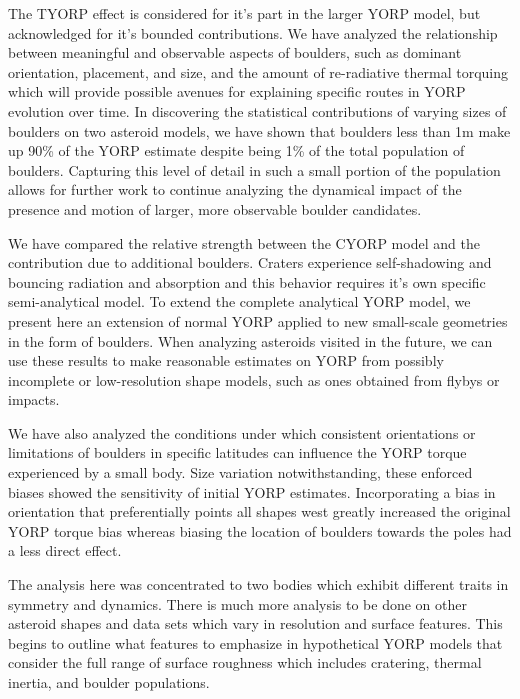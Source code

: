The TYORP effect is considered for it's part in the larger YORP model, but acknowledged for it's bounded contributions. We have analyzed the relationship between meaningful and observable aspects of boulders, such as dominant orientation, placement, and size, and the amount of re-radiative thermal torquing which will provide possible avenues for explaining specific routes in YORP evolution over time. In discovering the statistical contributions of varying sizes of boulders on two asteroid models, we have shown that boulders less than 1m make up 90\% of the YORP estimate despite being 1\% of the total population of boulders. Capturing this level of detail in such a small portion of the population allows for further work to continue analyzing the dynamical impact of the presence and motion of larger, more observable boulder candidates. 

We have compared the relative strength between the CYORP model and the contribution due to additional boulders. Craters experience self-shadowing and bouncing radiation and absorption and this behavior requires it's own specific semi-analytical model. To extend the complete analytical YORP model, we present here an extension of normal YORP applied to new small-scale geometries in the form of boulders. When analyzing asteroids visited in the future, we can use these results to make reasonable estimates on YORP from possibly incomplete or low-resolution shape models, such as ones obtained from flybys or impacts.

We have also analyzed the conditions under which consistent orientations or limitations of boulders in specific latitudes can influence the YORP torque experienced by a small body. Size variation notwithstanding, these enforced biases showed the sensitivity of initial YORP estimates. Incorporating a bias in orientation that preferentially points all shapes west greatly increased the original YORP torque bias whereas biasing the location of boulders towards the poles had a less direct effect.  

The analysis here was concentrated to two bodies which exhibit different traits in symmetry and dynamics. There is much more analysis to be done on other asteroid shapes and data sets which vary in resolution and surface features. This begins to outline what features to emphasize in hypothetical YORP models that consider the full range of surface roughness which includes cratering, thermal inertia, and boulder populations. 

